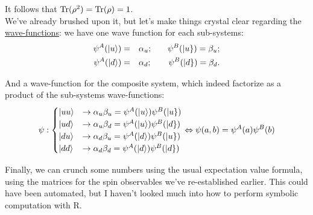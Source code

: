 \documentclass[solutions.tex]{subfiles}
\begin{document}
It follows that $\text{Tr}(\rho^2) = \text{Tr}(\rho) = 1$. \\

We've already brushed upon it, but let's make things crystal clear regarding
the \underline{wave-functions}: we have one wave function for each sub-systems:
\begin{equation*}\begin{aligned}
	\psi^A(|u\rangle) &=&& \alpha_u;&&&\psi^B(|u\}) = \beta_u; \\
	\psi^A(|d\rangle) &=&& \alpha_d;&&&\psi^B(|d\}) = \beta_d. \\
\end{aligned}\end{equation*}

And a wave-function for the composite system, which indeed factorize as
a product of the sub-systems wave-functions:
\[
	\psi : \begin{cases}
		|uu\rangle &\rightarrow \alpha_u\beta_u = \psi^A(|u\rangle)\psi^B(|u\}) \\
		|ud\rangle &\rightarrow \alpha_u\beta_d = \psi^A(|u\rangle)\psi^B(|d\}) \\
		|du\rangle &\rightarrow \alpha_d\beta_u = \psi^A(|d\rangle)\psi^B(|u\}) \\
		|dd\rangle &\rightarrow \alpha_d\beta_d = \psi^A(|d\rangle)\psi^B(|d\}) \\
	\end{cases} \Leftrightarrow \psi(a,b) = \psi^A(a)\psi^B(b)
\]

Finally, we can crunch some numbers using the usual expectation value
formula, using the matrices for the spin observables we've re-established
earlier. This could have been automated, but I haven't looked much into
how to perform symbolic computation with R.
\end{document}
